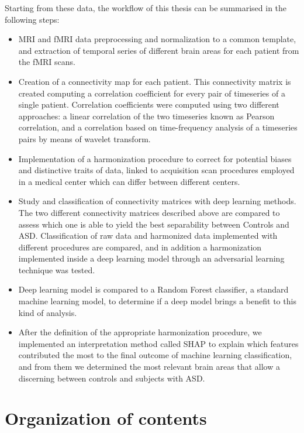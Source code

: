 \documentclass[11pt]{report}
\begin{document}
Starting from these data, the workflow of this thesis can be summarised in the following steps:

\begin{itemize}
\item MRI and fMRI data preprocessing and normalization to a common template, and extraction of temporal series of different brain areas for each patient from the fMRI scans.
\item Creation of a connectivity map for each patient. This connectivity matrix is created computing a correlation coefficient for every pair of timeseries of a single patient. Correlation coefficients were computed using two different approaches: a linear correlation of the two timeseries known as Pearson correlation, and a correlation based on time-frequency analysis of a timeseries pairs by means of wavelet transform.
\item Implementation of a harmonization procedure to correct for potential biases and distinctive traits of data, linked to acquisition scan procedures employed in a medical center which can differ between different centers.
\item Study and classification of connectivity matrices with deep learning methods. The two different connectivity matrices described above are compared to assess which one is able to yield the best separability between Controls and ASD.
Classification of raw data and harmonized data implemented with different procedures are compared, and in addition a harmonization implemented inside a deep learning model through an adversarial learning technique was tested.
\item Deep learning model is compared to a Random Forest classifier, a standard machine learning model, to determine if a deep model brings a benefit to this kind of analysis.
\item After the definition of the appropriate harmonization procedure, we implemented an interpretation method called SHAP to explain which features contributed the most to the final outcome of machine learning classification, and from them we determined the most relevant brain areas that allow a discerning between controls and subjects with ASD.
\end{itemize}

\chapter*{Organization of contents}
\end{document}
